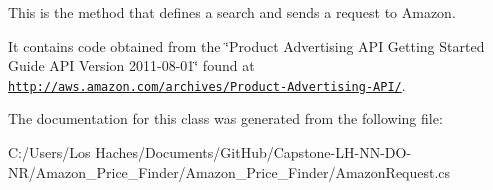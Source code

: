 This is the method that defines a search and sends a request to Amazon. 

It contains code obtained from the \char`\"{}\-Product Advertising A\-P\-I Getting 
\-Started Guide A\-P\-I Version 2011-\/08-\/01\char`\"{} found at \href{http://aws.amazon.com/archives/Product-Advertising-API/}{\tt http\-://aws.\-amazon.\-com/archives/\-Product-\/\-Advertising-\/\-A\-P\-I/}. 

The documentation for this class was generated from the following file\-:\begin{DoxyCompactItemize}
\item 
C\-:/\-Users/\-Los Haches/\-Documents/\-Git\-Hub/\-Capstone-\/\-L\-H-\/\-N\-N-\/\-D\-O-\/\-N\-R/\-Amazon\-\_\-\-Price\-\_\-\-Finder/\-Amazon\-\_\-\-Price\-\_\-\-Finder/Amazon\-Request.\-cs\end{DoxyCompactItemize}
